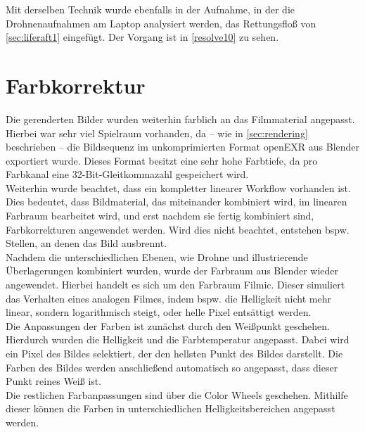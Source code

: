 \label{sec:liferaft2}
\noindent
Mit derselben Technik wurde ebenfalls in der Aufnahme, in der die Drohnenaufnahmen am Laptop analysiert werden, das Rettungsfloß von \autoref{sec:liferaft1} eingefügt. Der Vorgang ist in \autoref{resolve10} zu sehen.


\section{Farbkorrektur}

Die gerenderten Bilder wurden weiterhin farblich an das Filmmaterial angepasst. Hierbei war sehr viel Spielraum vorhanden, da -- wie in \autoref{sec:rendering} beschrieben -- die Bildsequenz im unkomprimierten Format openEXR aus Blender exportiert wurde. Dieses Format besitzt eine sehr hohe Farbtiefe, da pro Farbkanal eine 32-Bit-Gleitkommazahl gespeichert wird. \\
Weiterhin wurde beachtet, dass ein kompletter linearer Workflow vorhanden ist. Dies bedeutet, dass Bildmaterial, das miteinander kombiniert wird, im linearen Farbraum bearbeitet wird, und erst nachdem sie fertig kombiniert sind, Farbkorrekturen angewendet werden. Wird dies nicht beachtet, entstehen bspw. Stellen, an denen das Bild ausbrennt. \\
Nachdem die unterschiedlichen Ebenen, wie Drohne und illustrierende Überlagerungen kombiniert wurden, wurde der Farbraum aus Blender wieder angewendet. Hierbei handelt es sich um den Farbraum Filmic. Dieser simuliert das Verhalten eines analogen Filmes, indem bspw. die Helligkeit nicht mehr linear, sondern logarithmisch steigt, oder helle Pixel entsättigt werden. \\
Die Anpassungen der Farben ist zunächst durch den Weißpunkt geschehen. Hierdurch wurden die Helligkeit und die Farbtemperatur angepasst. Dabei wird ein Pixel des Bildes selektiert, der den hellsten Punkt des Bildes darstellt. Die Farben des Bildes werden anschließend automatisch so angepasst, dass dieser Punkt reines Weiß ist.\\
Die restlichen Farbanpassungen sind über die Color Wheels geschehen. Mithilfe dieser können die Farben in unterschiedlichen Helligkeitsbereichen angepasst werden. 


